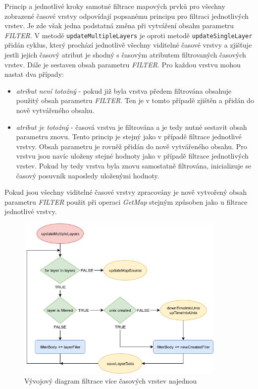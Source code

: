 Princip a jednotlivé kroky samotné filtrace mapových prvků pro všechny
zobrazené časové vrstvy odpovídají popsanému principu pro filtraci
jednotlivých vrstev. Je zde však jedna podstatná změna při vytváření
obsahu parametru \textit{FILTER}. V metodě \verb|updateMultipleLayers| je
oproti metodě \verb|updateSingleLayer| přidán cyklus, který prochází
jednotlivě všechny viditelné časové vrstvy a zjišťuje jestli jejich
časový atribut je shodný s časovým atributem filtrovaných časových
vrstev. Dále je sestaven obsah parametru \textit{FILTER}. Pro každou vrstvu
mohou nastat dva případy:
\begin{itemize}
\item\textit{atribut není totožný} - pokud již byla
vrstva předem filtrována obsahuje použitý obsah parametru
\textit{FILTER}. Ten je v tomto případě zjištěn a
přidán do nově vytvářeného obsahu.
\item\textit{atribut je totožný} - časová vrstva je
filtrována a je tedy nutné sestavit obsah parametru
znovu. Tento princip je stejný jako v případě filtrace
jednotlivé vrstvy. Obsah parametru je rovněž přidán do
nově vytvářeného obsahu. Pro vrstvu jsou navíc uloženy
stejné hodnoty jako v případě filtrace jednotlivých
vrstev. Pokud by tedy vrstva byla znovu samostatně
filtrována, inicializuje se časový posuvník naposledy
uloženými hodnoty.
\end{itemize}
Pokud jsou všechny viditelné časové vrstvy zpracovány je nově vytvořený
obsah parametru \textit{FILTER} použit při operaci \textit{GetMap} stejným
způsoben jako u filtrace jednotlivé vrstvy.

\begin{figure}[h!]
\centering
\includegraphics[width=0.9\textwidth]{../img/getMultipleLayers.png}
\caption{Vývojový diagram filtrace více časových vrstev najednou}
\label{fig:multiple-chart}
\end{figure}

